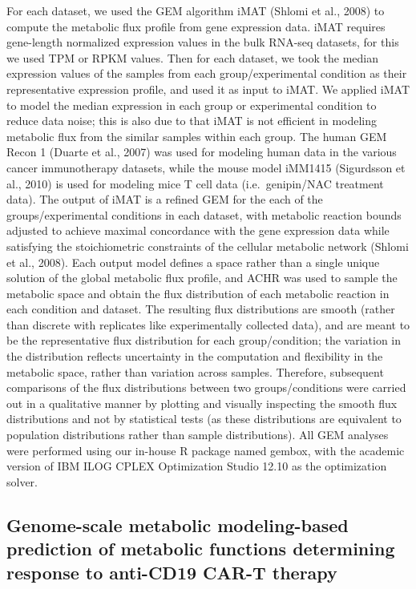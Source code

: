 \documentclass[12pt,twoside,openany,\mydriver]{thesis}  %
\begin{document}
For each dataset, we used the GEM algorithm iMAT (Shlomi et al., 2008) to compute the metabolic flux profile from gene expression data. iMAT requires gene-length normalized expression values in the bulk RNA-seq datasets, for this we used TPM or RPKM values. Then for each dataset, we took the median expression values of the samples from each group/experimental condition as their representative expression profile, and used it as input to iMAT. We applied iMAT to model the median expression in each group or experimental condition to reduce data noise; this is also due to that iMAT is not efficient in modeling metabolic flux from the similar samples within each group. The human GEM Recon 1 (Duarte et al., 2007) was used for modeling human data in the various cancer immunotherapy datasets, while the mouse model iMM1415 (Sigurdsson et al., 2010) is used for modeling mice T cell data (i.e.~genipin/NAC treatment data). The output of iMAT is a refined GEM for the each of the groups/experimental conditions in each dataset, with metabolic reaction bounds adjusted to achieve maximal concordance with the gene expression data while satisfying the stoichiometric constraints of the cellular metabolic network (Shlomi et al., 2008). Each output model defines a space rather than a single unique solution of the global metabolic flux profile, and ACHR was used to sample the metabolic space and obtain the flux distribution of each metabolic reaction in each condition and dataset. The resulting flux distributions are smooth (rather than discrete with replicates like experimentally collected data), and are meant to be the representative flux distribution for each group/condition; the variation in the distribution reflects uncertainty in the computation and flexibility in the metabolic space, rather than variation across samples. Therefore, subsequent comparisons of the flux distributions between two groups/conditions were carried out in a qualitative manner by plotting and visually inspecting the smooth flux distributions and not by statistical tests (as these distributions are equivalent to population distributions rather than sample distributions). All GEM analyses were performed using our in-house R package named gembox, with the academic version of IBM ILOG CPLEX Optimization Studio 12.10 as the optimization solver.

\hypertarget{genome-scale-metabolic-modeling-based-prediction-of-metabolic-functions-determining-response-to-anti-cd19-car-t-therapy}{%
\subsection{Genome-scale metabolic modeling-based prediction of metabolic functions determining response to anti-CD19 CAR-T therapy}\label{genome-scale-metabolic-modeling-based-prediction-of-metabolic-functions-determining-response-to-anti-cd19-car-t-therapy}}
\end{document}
